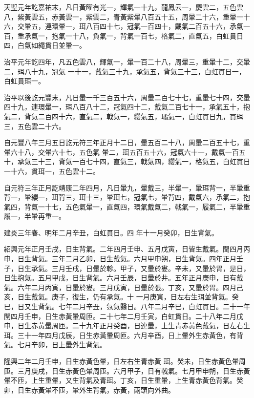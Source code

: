 \begin{pinyinscope}
 天聖元年訖嘉祐末，凡日黃曜有光一，輝氣一十九，龍鳳云一，慶雲二，五色雲八，紫黃雲五，赤黃雲一，紫雲二，青黃紫暈八百五十五，周暈二十六，重暈一十六，交暈五，連環暈一，珥八百四十七，冠氣一百四十，戴氣二百五十六，承氣一百，重承氣一，抱氣一十八，負氣一，背氣一百七，格氣二，直氣五，白虹貫日四，白氣如繩貫日並暈一。



 治平元年訖四年，凡五色雲八，輝氣一，暈一百二十八，周暈三，重暈十二，交暈二，珥八十九，冠氣
 一十一，戴氣三十九，承氣五，背氣三十三，白虹貫日一，白虹貫珥一。



 治平以後訖元豐末，凡日暈一千三百五十六，周暈二百七十七，重暈七十四，交暈四十九，連環暈一，珥八百八十二，冠氣四十二，戴氣二百七十一，承氣五十，抱氣二，背氣二百四十六，直氣二，戟氣一，纓氣五，璚氣一，白虹貫日九，貫珥三，五色雲二十六。



 自元豐八年三月五日訖元符三年正月十二日，暈五百二十八，周暈二百五十七，重暈六十八，交暈六十七，五色氣
 暈二，珥五百五十六，冠氣六十一，戴氣一百五十，承氣三十三，背氣一百七十四，直氣三，戟氣四，纓氣一，格氣五，白虹貫日一十六，貫珥一，五色雲十二。



 自元符三年正月訖靖康二年四月，凡日暈九，暈戴三，半暈一，暈珥背一，半暈重背一，暈纓一，珥背三，珥十三，暈珥七，冠氣七，暈背四，戴氣六，承氣二，抱氣四，背氣一十七，五色氣暈一，直氣四，環氣戴氣二，戟氣一，履氣二，半暈重履一，半暈再重一。



 建炎三年春、明年二月辛丑，白虹貫日。四
 年十一月癸卯，日生背氣。



 紹興元年正月壬戌，日生背氣。二年四月壬申、五月戊寅，日皆生戴氣。閏四月丙申，日生背氣。三年二月乙卯，日生戴氣。六月甲申朔，日生背氣。四年正月壬子，日生承氣。三月壬戌，日暈於軫。甲子，又暈於婁。辛未，又暈於胃，是日，日生抱氣。五月甲戌，日生背氣。六月壬辰，日暈於井。五年正月庚申，日有戴氣。六年二月丙寅，日暈於婁。三月戊寅，日暈於張。丁亥，又暈於胃。四月己亥，日生戴氣。庚子，復生，仍有承氣。十
 一月庚寅，日左右生珥並背氣。癸巳，日又生背氣。七年二月辛丑，氛氣翳日。八年二月辛巳，白虹貫日。二十一年閏四月壬申，日生赤黃暈周匝。二十七年二月壬寅，白虹貫日。二十八年二月戊申，日生赤黃暈周匝。二十九年正月癸酉，日連暈，上生青赤黃色戴氣，日左右生珥。三十一年四月戊辰，日生赤黃暈周匝。六月辛酉，日上暈外生赤黃色，有背氣。七月辛卯，日上暈外生背氣。



 隆興二年二月壬申，日生赤黃色暈，日左右生青赤黃
 珥。癸未，日生赤黃色暈周匝。三月庚戌，日生赤黃色暈周匝。六月甲子，日有戟氣。七月甲申朔，日生赤黃暈不匝，上生重暈，又生背氣及青珥。丁亥，日生重暈，上生青赤黃色背氣。癸卯，日生赤黃暈不匝，暈外生背氣，赤黃，兩頭向外曲。




\end{pinyinscope}
